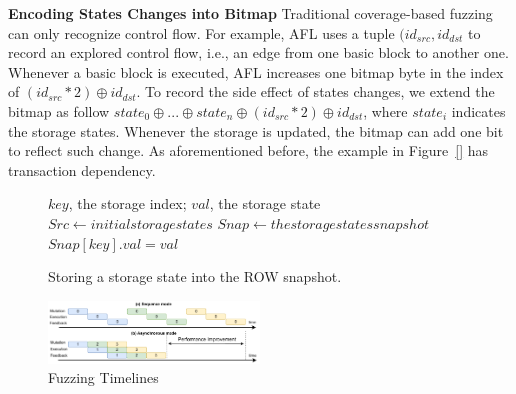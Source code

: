 \noindent \textbf{Encoding States Changes into Bitmap}
\label{sec:runner:bitmap}
Traditional coverage-based fuzzing can only recognize control flow. For example, AFL uses a tuple $(id_{src}, id_{dst}$ to record an explored control flow, i.e., an edge from one basic block to another one. Whenever a basic block is executed, AFL increases one bitmap byte in the index of $(id_{src} * 2) \oplus id_{dst}$. 
To record the side effect of states changes, we extend the bitmap as follow $state_0 \oplus ... \oplus state_n \oplus (id_{src} * 2) \oplus id_{dst}$, where $state_i$ indicates the storage states. 
Whenever the storage is updated, the bitmap can add one bit to reflect such change. 
As aforementioned before, the example in Figure~\ref{} has transaction dependency.  



\begin{figure}[t]
\begin{algorithm}[H]
\caption{Storing a storage state into the ROW snapshot.}
\label{algo:row_sstore}
\begin{algorithmic}[1]
    \Require $key$, the storage index; $val$, the storage state
    \State $Src \gets initial storage states$
    \State $Snap \gets the storage states snapshot$
        \State $Snap[key].val = val$
        \State \Return
    \EndIf
\end{algorithmic}
\end{algorithm}
\end{figure}


\begin{figure}[t]
\centerline{\includegraphics[width=0.5\textwidth]{images/GFL-async_cpy.drawio.pdf}}
\caption{Fuzzing Timelines}
\vspace{-0.1in}
\label{fig:async_cpy}
\end{figure}

